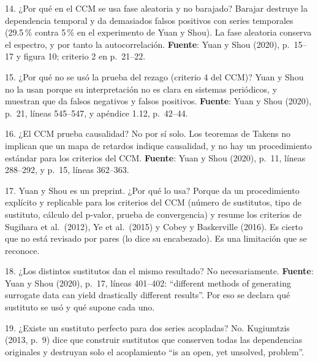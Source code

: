 \documentclass[11pt,openany]{book}
\begin{document}
\begin{respuesta}{14. ¿Por qué en el CCM se usa fase aleatoria y no barajado?}
Barajar destruye la dependencia temporal y da demasiados falsos positivos con series temporales (29.5\,\% contra 5\,\% en el experimento de Yuan y Shou). La fase aleatoria conserva el espectro, y por tanto la autocorrelación. \textbf{Fuente}: Yuan y Shou (2020), p.~15--17 y figura 10; criterio 2 en p.~21--22.
\end{respuesta}

\begin{respuesta}{15. ¿Por qué no se usó la prueba del rezago (criterio 4 del CCM)?}
Yuan y Shou no la usan porque su interpretación no es clara en sistemas periódicos, y muestran que da falsos negativos y falsos positivos. \textbf{Fuente}: Yuan y Shou (2020), p.~21, líneas 545--547, y apéndice 1.12, p.~42--44.
\end{respuesta}

\begin{respuesta}{16. ¿El CCM prueba causalidad?}
No por sí solo. Los teoremas de Takens no implican que un mapa de retardos indique causalidad, y no hay un procedimiento estándar para los criterios del CCM. \textbf{Fuente}: Yuan y Shou (2020), p.~11, líneas 288--292, y p.~15, líneas 362--363.
\end{respuesta}

\begin{respuesta}{17. Yuan y Shou es un preprint. ¿Por qué lo usa?}
Porque da un procedimiento explícito y replicable para los criterios del CCM (número de sustitutos, tipo de sustituto, cálculo del p-valor, prueba de convergencia) y resume los criterios de Sugihara et al.\ (2012), Ye et al.\ (2015) y Cobey y Baskerville (2016). Es cierto que no está revisado por pares (lo dice su encabezado). Es una limitación que se reconoce.
\end{respuesta}

\begin{respuesta}{18. ¿Los distintos sustitutos dan el mismo resultado?}
No necesariamente. \textbf{Fuente}: Yuan y Shou (2020), p.~17, líneas 401--402: ``different methods of generating surrogate data can yield drastically different results''. Por eso se declara qué sustituto se usó y qué supone cada uno.
\end{respuesta}

\begin{respuesta}{19. ¿Existe un sustituto perfecto para dos series acopladas?}
No. Kugiumtzis (2013, p.~9) dice que construir sustitutos que conserven todas las dependencias originales y destruyan solo el acoplamiento ``is an open, yet unsolved, problem''.
\end{respuesta}
\end{document}
